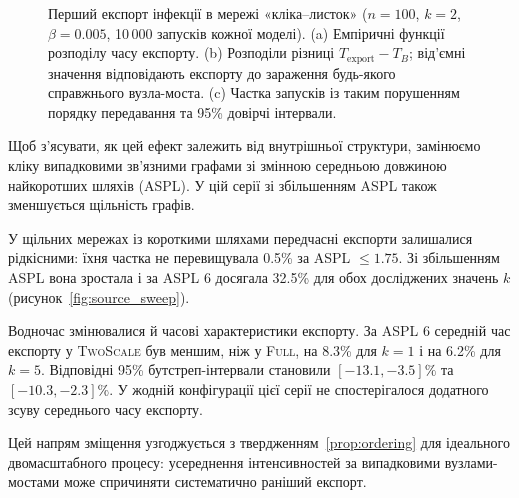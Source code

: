 \documentclass[a4paper,fleqn]{cas-sc}
\newcommand{\Full}{\textup{\textsc{Full}}}
\newcommand{\TS}{\textup{\textsc{TwoScale}}}
\begin{document}
\begin{figure}[tbp]
\caption{%
Перший експорт інфекції в мережі
«кліка--листок» ($n=100$, $k=2$,
$\beta=0.005$, 10\,000 запусків кожної моделі).
(a) Емпіричні функції розподілу часу експорту.
(b) Розподіли різниці $T_{\mathrm{export}}-T_B$;
від'ємні значення відповідають експорту
до зараження будь-якого справжнього вузла-моста.
(c) Частка запусків із таким порушенням
порядку передавання та 95\% довірчі інтервали.
}
\label{fig:clique_leaf}
\end{figure}

Щоб з'ясувати, як цей ефект залежить
від внутрішньої структури, замінюємо
кліку випадковими зв'язними графами
зі змінною середньою довжиною
найкоротших шляхів (ASPL).
У цій серії зі збільшенням ASPL
також зменшується щільність графів.

У щільних мережах із короткими шляхами
передчасні експорти залишалися рідкісними:
їхня частка не перевищувала 0.5\%
за ASPL $\leq 1.75$.
Зі збільшенням ASPL вона зростала
і за ASPL 6 досягала 32.5\%
для обох досліджених значень $k$
(рисунок~\ref{fig:source_sweep}).

Водночас змінювалися й часові характеристики
експорту. За ASPL 6 середній час експорту
у \TS{} був меншим, ніж у \Full{},
на 8.3\% для $k=1$ і на 6.2\% для $k=5$.
Відповідні 95\% бутстреп-інтервали
становили $[-13.1,-3.5]\%$
та $[-10.3,-2.3]\%$.
У жодній конфігурації цієї серії
не спостерігалося додатного
зсуву середнього часу експорту.

Цей напрям зміщення узгоджується
з твердженням~\ref{prop:ordering}
для ідеального двомасштабного процесу:
усереднення інтенсивностей за випадковими
вузлами-мостами може спричиняти
систематично раніший експорт.
\end{document}
